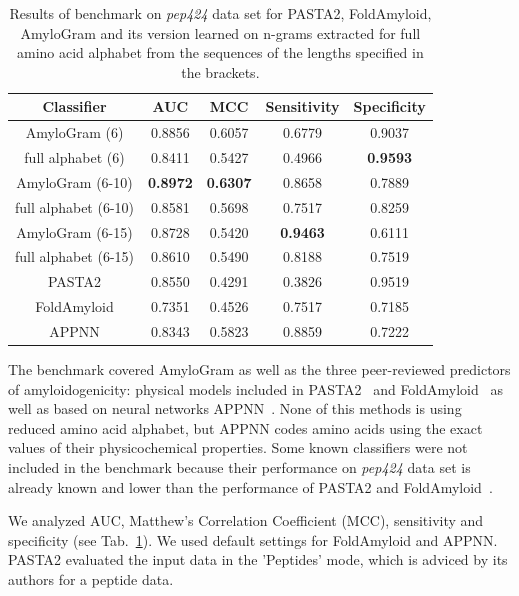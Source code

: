 \documentclass[fleqn,10pt,twoside]{gcb15submission}
\begin{document}
\begin{table}[ht]
\centering
\small
\caption{Results of benchmark on \textit{pep424} data set for PASTA2, 
FoldAmyloid, AmyloGram and its version learned on n-grams extracted for full amino acid alphabet from the sequences of the lengths specified in 
the brackets.} 
\label{tab:bench_summary}
\begin{tabular}{ccccc}
  \toprule
Classifier & AUC & MCC & Sensitivity & Specificity \\ 
  \midrule
AmyloGram (6) & 0.8856 & 0.6057 & 0.6779 & 0.9037 \\
   \rowcolor[gray]{0.85}full alphabet (6) & 0.8411 & 0.5427 & 0.4966 & 
\textbf{0.9593} \\ 

AmyloGram (6-10) & \textbf{0.8972} & \textbf{0.6307} & 
0.8658 & 0.7889 \\ 
  \rowcolor[gray]{0.85}full alphabet (6-10) & 0.8581 & 0.5698 & 0.7517 & 0.8259 
\\ 
AmyloGram (6-15) & 0.8728 & 0.5420 & \textbf{0.9463} & 0.6111 \\
   \rowcolor[gray]{0.85}full alphabet (6-15) & 0.8610 & 0.5490 & 0.8188 & 
0.7519 \\ 
\hline \hline
  PASTA2 & 0.8550 & 0.4291 & 0.3826 & 0.9519 \\ 
   \rowcolor[gray]{0.85}FoldAmyloid & 0.7351 & 0.4526 & 0.7517 & 0.7185 \\ 
  APPNN & 0.8343 & 0.5823 & 0.8859 & 0.7222 \\ 
   \bottomrule
\end{tabular}
\end{table}

The benchmark covered AmyloGram as well as the three peer-reviewed predictors of 
amyloidogenicity: physical models included in PASTA2~\citep{walsh_pasta_2014} and 
FoldAmyloid~\citep{garbuzynskiy_foldamyloid:_2010} as well as based on neural networks 
APPNN~\citep{familia_prediction_2015}. None of this methods is using 
reduced amino acid alphabet, but APPNN codes amino acids using the exact 
values of their physicochemical properties. Some known classifiers were 
not included in the benchmark because their performance on \textit{pep424} 
data set is already known and lower than the performance of PASTA2 and 
FoldAmyloid~\citep{walsh_pasta_2014}.

  We analyzed AUC, Matthew's Correlation Coefficient (MCC), sensitivity and 
specificity (see Tab.~\ref{tab:bench_summary}). We used default settings for 
FoldAmyloid and APPNN. PASTA2 evaluated the input data in the 'Peptides' mode, 
which is adviced by its authors for a peptide data.
\end{document}
